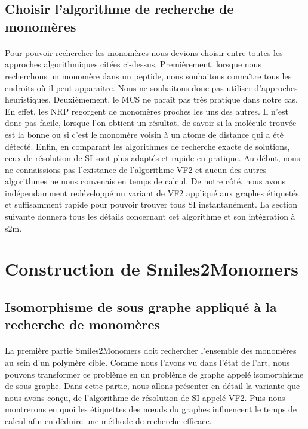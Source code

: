 \documentclass[12pt,french,twoside]{report}
\begin{document}
\subsection{Choisir l'algorithme de recherche de monomères}

\paragraph{}Pour pouvoir rechercher les monomères nous devions choisir entre toutes les approches algorithmiques citées ci-dessus.
Premièrement, lorsque nous recherchons un monomère dans un peptide, nous souhaitons connaître tous les endroits où il peut apparaitre.
Nous ne souhaitons donc pas utiliser d'approches heuristiques.
Deuxièmement, le MCS ne paraît pas très pratique dans notre cas.
En effet, les NRP regorgent de monomères proches les uns des autres.
Il n'est donc pas facile, lorsque l'on obtient un résultat, de savoir si la molécule trouvée est la bonne ou si c'est le monomère voisin à un atome de distance qui a été détecté.
Enfin, en comparant les algorithmes de recherche exacte de solutions, ceux de résolution de SI sont plus adaptés et rapide en pratique.
Au début, nous ne connaissions pas l'existance de l'algorithme VF2 et aucun des autres algorithmes ne nous convenais en temps de calcul.
De notre côté, nous avons indépendamment redéveloppé un variant de VF2 appliqué aux graphes étiquetés et suffisamment rapide pour pouvoir trouver tous SI instantanément.
La section suivante donnera tous les détails concernant cet algorithme et son intégration à s2m.




\section{Construction de Smiles2Monomers}

\subsection{Isomorphisme de sous graphe appliqué à la recherche de monomères}

\label{isomorphisme_p}

\paragraph{}La première partie Smiles2Monomers doit rechercher l'ensemble des monomères au sein d'un polymère cible.
Comme nous l'avons vu dans l'état de l'art, nous pouvons transformer ce problème en un problème de graphe appelé isomorphisme de sous graphe.
Dans cette partie, nous allons présenter en détail la variante que nous avons conçu, de l'algorithme de résolution de SI appelé VF2.
Puis nous montrerons en quoi les étiquettes des n\oe{}uds du graphes influencent le temps de calcul afin en déduire une méthode de recherche efficace.
\end{document}
